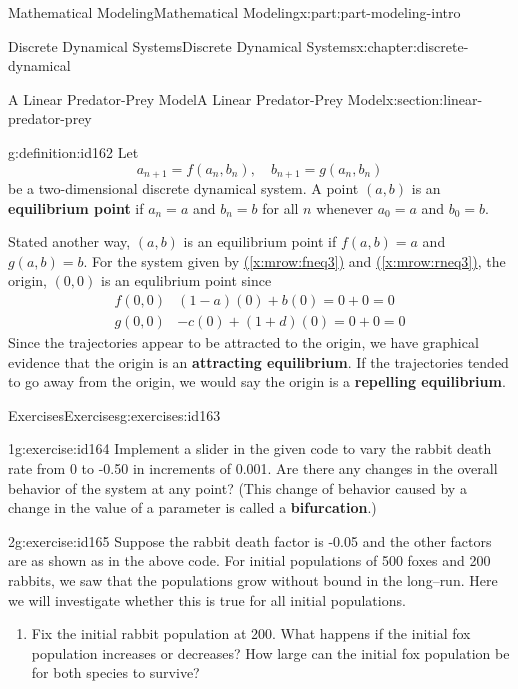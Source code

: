 \documentclass[oneside,10pt,]{book}
\newcommand{\xreffont}{\relax}
\newcommand{\terminology}[1]{\textbf{#1}}
\numberwithin{equation}{section}
\newcommand{\amp}{&}
\begin{document}
\begin{partptx}{Mathematical Modeling}{}{Mathematical Modeling}{}{}{x:part:part-modeling-intro}
\begin{chapterptx}{Discrete Dynamical Systems}{}{Discrete Dynamical Systems}{}{}{x:chapter:discrete-dynamical}
\begin{sectionptx}{A Linear Predator-Prey Model}{}{A Linear Predator-Prey Model}{}{}{x:section:linear-predator-prey}
\begin{definition}{}{g:definition:id162}
Let%
%
\begin{equation*}
a_{n+1} = f(a_n,b_n), \quad b_{n+1}=g(a_n,b_n)
\end{equation*}
be a two-dimensional discrete dynamical system. A point \((a,b)\) is an \terminology{equilibrium point} if \(a_n=a\) and \(b_n=b\) for all \(n\) whenever \(a_0=a\) and \(b_0=b\).%
\end{definition}
Stated another way, \((a,b)\) is an equilibrium point if \(f(a,b)=a\) and \(g(a,b)=b\). For the system given by \hyperref[x:mrow:fneq3]{({\xreffont\ref{x:mrow:fneq3}})} and \hyperref[x:mrow:rneq3]{({\xreffont\ref{x:mrow:rneq3}})}, the origin, \((0,0)\) is an equlibrium point since%
%
\begin{equation*}
\begin{aligned}
f(0,0) \amp (1-a)(0) + b(0) = 0+0 = 0 \\
g(0,0) \amp -c(0) + (1+d)(0) = 0+0 = 0
\end{aligned}
\end{equation*}
Since the trajectories appear to be attracted to the origin, we have graphical evidence that the origin is an \terminology{attracting equilibrium}. If the trajectories tended to go away from the origin, we would say the origin is a \terminology{repelling equilibrium}.%
%
%
\typeout{************************************************}
\typeout{************************************************}
%
\begin{exercises-subsection-numberless}{Exercises}{}{Exercises}{}{}{g:exercises:id163}
\begin{divisionexercise}{1}{}{}{g:exercise:id164}%
Implement a slider in the given code to vary the rabbit death rate from 0 to -0.50 in increments of 0.001. Are there any changes in the overall behavior of the system at any point? (This change of behavior caused by a change in the value of a parameter is called a \terminology{bifurcation}.)%
\end{divisionexercise}%
\begin{divisionexercise}{2}{}{}{g:exercise:id165}%
Suppose the rabbit death factor is -0.05 and the other factors are as shown as in the above code. For initial populations of 500 foxes and 200 rabbits, we saw that the populations grow without bound in the long–run. Here we will investigate whether this is true for all initial populations.%
\begin{enumerate}[font=\bfseries,label=(\alph*),ref=\alph*]
\item{}Fix the initial rabbit population at 200. What happens if the initial fox population increases or decreases? How large can the initial fox population be for both species to survive?%

\end{enumerate}
\end{divisionexercise}
\end{exercises-subsection-numberless}
\end{sectionptx}
\end{chapterptx}
\end{partptx}
\end{document}

